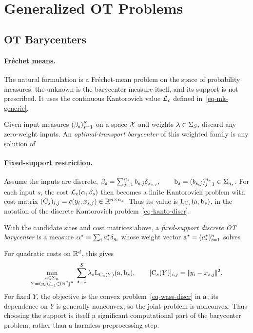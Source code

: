 \section{Generalized OT Problems}
\label{sec-generalized-ot-problems}
\subsection{OT Barycenters}
\label{sec-barycenters}
\paragraph{Fr\'echet means.}
The natural formulation is a Fr\'echet-mean problem on the space of probability measures: the unknown is the barycenter measure itself, and its support is not prescribed. It uses the continuous Kantorovich value $\mathcal{L}_c$ defined in~\eqref{eq-mk-generic}.

\begin{defn}\label{def-ot-barycenter}
Given input measures $(\beta_s)_{s=1}^S$ on a space $\mathcal{X}$ and weights $\lambda\in\Sigma_S$, discard any zero-weight inputs. An \emph{optimal-transport barycenter} of this weighted family is any solution of
\end{defn}
\paragraph{Fixed-support restriction.}
Assume the inputs are discrete, \(\beta_s=\sum_{j=1}^{n_s} b_{s,j}\delta_{x_{s,j}}, \qquad \mathrm{b}_s=(b_{s,j})_{j=1}^{n_s}\in\Sigma_{n_s}.\)
For each input $s$, the cost $\mathcal{L}_c(\alpha,\beta_s)$ then becomes a finite Kantorovich problem with cost matrix
\((\mathrm{C}_s)_{i,j}=c(y_i,x_{s,j}) \in \mathbb{R}^{n\times n_s}.\)
Thus its value is $\mathrm{L}_{\mathrm{C}_s}(\mathrm{a},\mathrm{b}_s)$, in the notation of the discrete Kantorovich problem~\eqref{eq-kanto-discr}.

\begin{defn}\label{def-fixed-support-discrete-barycenter}
With the candidate sites and cost matrices above, a \emph{fixed-support discrete OT barycenter} is a measure $\alpha^\star=\sum_i a_i^\star\delta_{y_i}$ whose weight vector $\mathrm{a}^\star=(a_i^\star)_{i=1}^n$ solves
\end{defn}
For quadratic costs on $\mathbb{R}^d$, this gives
\[
\underset{\substack{\mathrm{a}\in\Sigma_n\\Y=(y_i)_{i=1}^n\in(\mathbb{R}^d)^n}}{\min}\;
\sum_{s=1}^S\lambda_s\mathrm{L}_{\mathrm{C}_s(Y)}(\mathrm{a},\mathrm{b}_s),
\qquad
[\mathrm{C}_s(Y)]_{i,j}=|\!| y_i-x_{s,j} |\!|^2.
\]
For fixed $Y$, the objective is the convex problem~\eqref{eq-wass-discr} in $\mathrm{a}$; its dependence on $Y$ is generally nonconvex, so the joint problem is nonconvex. Thus choosing the support is itself a significant computational part of the barycenter problem, rather than a harmless preprocessing step.

